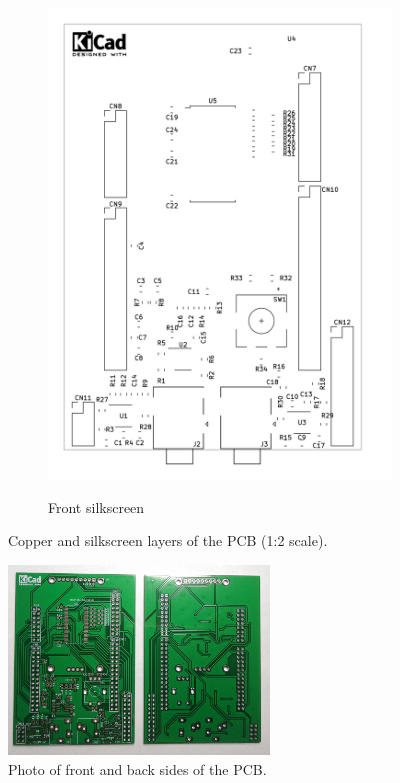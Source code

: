 \documentclass[a4paper,twoside,12pt]{book}
\begin{document}
\begin{figure}[H]
\begin{subfigure}[h]{0.273\textwidth}
        \includegraphics[width=\textwidth]{images/Board_silkscreen}
        \label{fig:board3}
        \caption{Front silkscreen}
    \end{subfigure}
    \caption{Copper and silkscreen layers of the PCB (1:2 scale).}
    \label{fig:board}
\end{figure}

\begin{figure}[H]
    \centering
    \includegraphics[width=0.618\textwidth]{images/photo_boards}
    \caption{Photo of front and back sides of the PCB.}
    \label{fig:photo_boards}
\end{figure}
\end{document}
